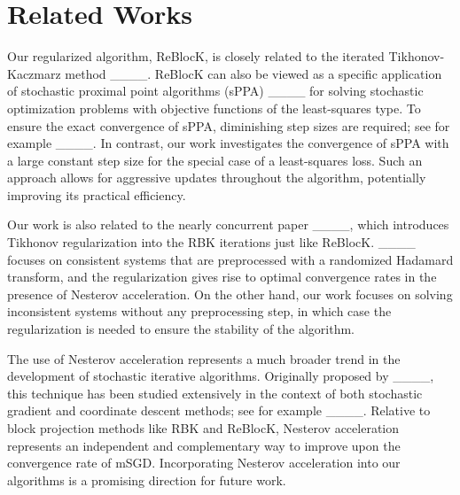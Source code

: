 \section{Related Works}
Our regularized algorithm, ReBlocK, is closely related to the iterated Tikhonov-Kaczmarz method ____. ReBlocK can also be viewed as a specific application of stochastic proximal point algorithms (sPPA) ____ for solving stochastic optimization problems with objective functions of the least-squares type. To ensure the exact convergence of sPPA, diminishing step sizes are required; see for example ____. In contrast, our work investigates the convergence of sPPA with a large constant step size for the special case of a least-squares loss. Such an approach allows for aggressive updates throughout the algorithm, potentially improving its practical efficiency. 

Our work is also related to the nearly concurrent paper ____, which introduces Tikhonov regularization into the RBK iterations just like ReBlocK. ____ focuses on consistent systems that are preprocessed with a randomized Hadamard transform, and the regularization gives rise to optimal convergence rates in the presence of Nesterov acceleration. On the other hand, our work focuses on solving inconsistent systems without any preprocessing step, in which case the regularization is needed to ensure the stability of the algorithm.

The use of Nesterov acceleration represents a much broader trend in the development of stochastic iterative algorithms. Originally proposed by ____, this technique has been studied extensively in the context of both stochastic gradient and coordinate descent methods; see for example ____. Relative to block projection methods like RBK and ReBlocK, Nesterov acceleration represents an independent and complementary way to improve upon the convergence rate of mSGD. Incorporating Nesterov acceleration into our algorithms is a promising direction for future work.